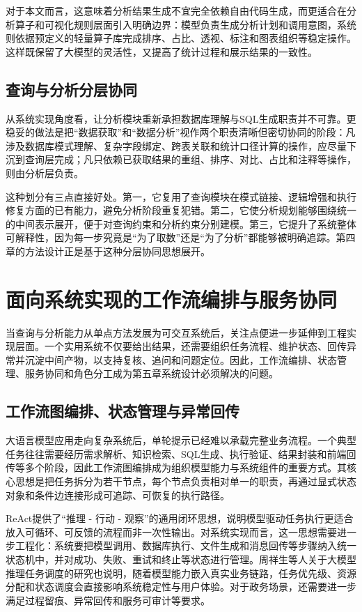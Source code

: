 对于本文而言，这意味着分析结果生成不宜完全依赖自由代码生成，而更适合在分析算子和可视化规则层面引入明确边界：模型负责生成分析计划和调用意图，系统则依据预定义的轻量算子库完成排序、占比、透视、标注和图表组织等稳定操作。这样既保留了大模型的灵活性，又提高了统计过程和展示结果的一致性。

\subsection{查询与分析分层协同}

从系统实现角度看，让分析模块重新承担数据库理解与SQL生成职责并不可靠。更稳妥的做法是把“数据获取”和“数据分析”视作两个职责清晰但密切协同的阶段：凡涉及数据库模式理解、复杂字段绑定、跨表关联和统计口径计算的操作，应尽量下沉到查询层完成；凡只依赖已获取结果的重组、排序、对比、占比和注释等操作，则由分析层负责。

这种划分有三点直接好处。第一，它复用了查询模块在模式链接、逻辑增强和执行修复方面的已有能力，避免分析阶段重复犯错。第二，它使分析规划能够围绕统一的中间表示展开，便于对查询约束和分析约束分别建模。第三，它提升了系统整体可解释性，因为每一步究竟是“为了取数”还是“为了分析”都能够被明确追踪。第四章的方法设计正是基于这种分层协同思想展开。

\section{面向系统实现的工作流编排与服务协同}

当查询与分析能力从单点方法发展为可交互系统后，关注点便进一步延伸到工程实现层面。一个实用系统不仅要给出结果，还需要组织任务流程、维护状态、回传异常并沉淀中间产物，以支持复核、追问和问题定位。因此，工作流编排、状态管理、服务协同和角色分工成为第五章系统设计必须解决的问题。

\subsection{工作流图编排、状态管理与异常回传}

大语言模型应用走向复杂系统后，单轮提示已经难以承载完整业务流程。一个典型任务往往需要经历需求解析、知识检索、SQL生成、执行验证、结果封装和前端回传等多个阶段，因此工作流图编排成为组织模型能力与系统组件的重要方式。其核心思想是把任务拆分为若干节点，每个节点负责相对单一的职责，再通过显式状态对象和条件边连接形成可追踪、可恢复的执行路径。

ReAct\cite{yao2023react}提供了“推理 - 行动 - 观察”的通用闭环思想，说明模型驱动任务执行更适合放入可循环、可反馈的流程而非一次性输出。对系统实现而言，这一思想需要进一步工程化：系统要把模型调用、数据库执行、文件生成和消息回传等步骤纳入统一状态机中，并对成功、失败、重试和终止等状态进行管理。周祥生等人\cite{周祥生2025}关于大模型推理任务调度的研究也说明，随着模型能力嵌入真实业务链路，任务优先级、资源分配和状态调度会直接影响系统稳定性与用户体验。对于政务场景，还需要进一步满足过程留痕、异常回传和服务可审计等要求\cite{吴重庆2025,兰洪浩2025}。

